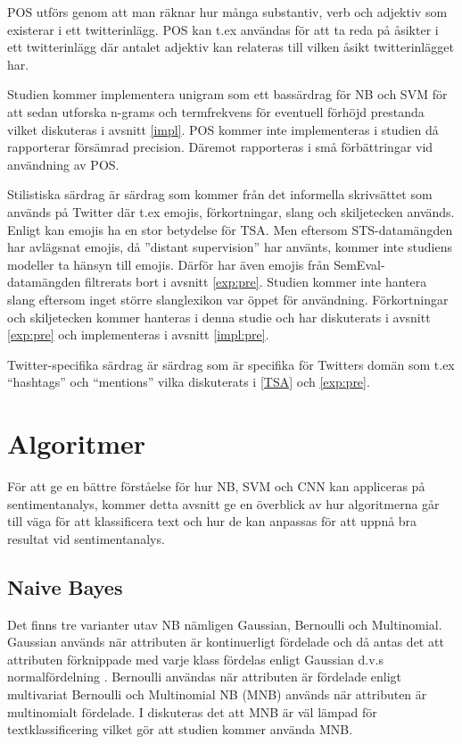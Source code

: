 \documentclass{kaumasters} %
\begin{document}
POS utförs genom att man räknar hur många substantiv, verb och adjektiv som existerar i ett twitterinlägg. POS kan t.ex användas för att ta reda på åsikter i ett twitterinlägg där antalet adjektiv kan relateras till vilken åsikt twitterinlägget har.

Studien kommer implementera unigram som ett bassärdrag för NB och SVM för att sedan utforska n-grams och termfrekvens för eventuell förhöjd prestanda vilket diskuteras i avsnitt \ref{impl}. POS kommer inte implementeras i studien då \cite{go2009twitter, feature:001} rapporterar försämrad precision. Däremot rapporteras i \cite{feature:002} små förbättringar vid användning av POS.

Stilistiska särdrag är särdrag som kommer från det informella skrivsättet som används på Twitter där t.ex emojis, förkortningar, slang och skiljetecken används. Enligt \cite{feature:002} kan emojis ha en stor betydelse för TSA. Men eftersom STS-datamängden har avlägsnat emojis, då ''distant supervision'' \cite{sts:001} har använts, kommer inte studiens modeller ta hänsyn till emojis. Därför har även emojis från SemEval-datamängden filtrerats bort i avsnitt \ref{exp:pre}. Studien kommer inte hantera slang eftersom inget större slanglexikon var öppet för användning. 
Förkortningar och skiljetecken kommer hanteras i denna studie och har diskuterats i avsnitt \ref{exp:pre} och implementeras i avsnitt \ref{impl:pre}.

Twitter-specifika särdrag är särdrag som är specifika för Twitters domän som t.ex “hashtags” och “mentions” vilka diskuterats i \ref{TSA} och \ref{exp:pre}.




\section{Algoritmer}
För att ge en bättre förståelse för hur NB, SVM och CNN kan appliceras på sentimentanalys, kommer detta avsnitt ge en överblick av hur algoritmerna går till väga för att klassificera text och hur de kan anpassas för att uppnå bra resultat vid sentimentanalys.

\subsection{Naive Bayes}
Det finns tre varianter utav NB nämligen Gaussian, Bernoulli och Multinomial. Gaussian används när attributen är kontinuerligt fördelade och då antas det att attributen förknippade med varje klass fördelas enligt Gaussian d.v.s normalfördelning \cite{nb:002}. Bernoulli användas när attributen är fördelade enligt multivariat Bernoulli \cite{nb:004} och Multinomial NB (MNB) används när attributen är multinomialt fördelade. I \cite{nb:003} diskuteras det att MNB är väl lämpad för textklassificering vilket gör att studien kommer använda MNB.
\end{document}
